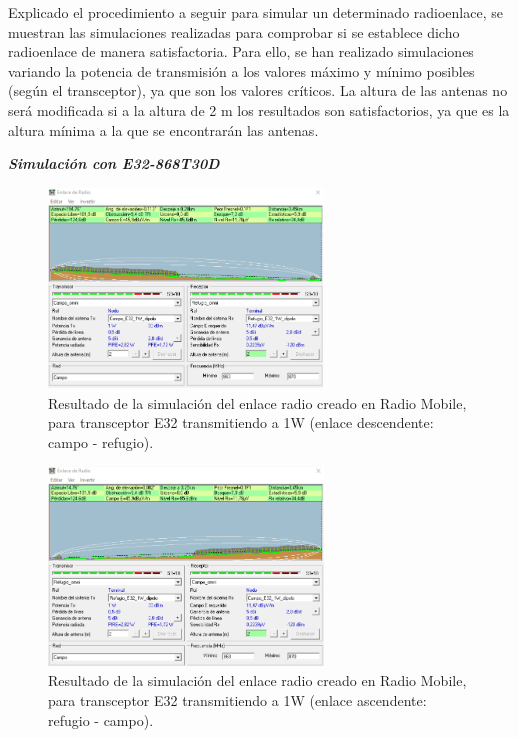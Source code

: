 \documentclass[12pt]{article}
\begin{document}
	\noindent Explicado el procedimiento a seguir para simular un determinado radioenlace, se muestran las simulaciones realizadas para comprobar si se establece dicho radioenlace de manera satisfactoria. Para ello, se han realizado simulaciones variando la potencia de transmisión a los valores máximo y mínimo posibles (según el transceptor), ya que son los valores críticos. La altura de las antenas no será modificada si a la altura de 2 m los resultados son satisfactorios, ya que es la altura mínima a la que se encontrarán las antenas. \\
	
	\pagebreak
	
	\noindent \textit{\textbf{Simulación con E32-868T30D}} \\
	
	\begin{figure}[h!]
		\begin{center}
			\includegraphics[width=0.65\textwidth]{img/resultado_e32_1W_desc.png}
			\caption{Resultado de la simulación del enlace radio creado en Radio Mobile, para transceptor E32 transmitiendo a 1W (enlace descendente: campo - refugio).}
			\label{fig: resultado enlace e32 1W descendente radio mobile}
		\end{center}
	\end{figure}

	
	\begin{figure}[h!]
			\begin{center}
				\includegraphics[width=0.65\textwidth]{img/resultado_e32_1W_asc.png}
				\caption{Resultado de la simulación del enlace radio creado en Radio Mobile, para transceptor E32 transmitiendo a 1W (enlace ascendente: refugio - campo).}
				\label{fig: resultado enlace e32 1W ascendente radio mobile}
			\end{center}
	\end{figure}
	
\end{document}
